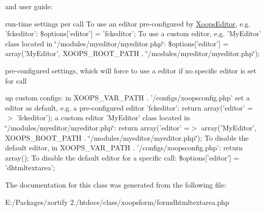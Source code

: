 \begin{DoxyItemize}
\item 
\end{DoxyItemize}and user guide\-:  
\begin{DoxyItemize}
\item 
\end{DoxyItemize}run-\/time settings per call To use an editor pre-\/configured by \hyperlink{}{Xoops\-Editor}, e.\-g. 'fckeditor'\-: {\ttfamily \$options\mbox{[}'editor'\mbox{]} = 'fckeditor';} To use a custom editor, e.\-g. 'My\-Editor' class located in \char`\"{}/modules/myeditor/myeditor.\-php\char`\"{}\-: {\ttfamily \$options\mbox{[}'editor'\mbox{]} = array('My\-Editor', X\-O\-O\-P\-S\-\_\-\-R\-O\-O\-T\-\_\-\-P\-A\-T\-H . \char`\"{}/modules/myeditor/myeditor.\-php\char`\"{});}    
\begin{DoxyItemize}
\item 
\end{DoxyItemize}pre-\/configured settings, which will force to use a editor if no specific editor is set for call  
\begin{DoxyItemize}
\item 
\end{DoxyItemize}up custom configs\-: in X\-O\-O\-P\-S\-\_\-\-V\-A\-R\-\_\-\-P\-A\-T\-H . '/configs/xoopsconfig.php' set a editor as default, e.\-g. a pre-\/configured editor 'fckeditor'\-: {\ttfamily return array('editor' =$>$ 'fckeditor');} a custom editor 'My\-Editor' class located in \char`\"{}/modules/myeditor/myeditor.\-php\char`\"{}\-: {\ttfamily return array('editor' =$>$ array('My\-Editor', X\-O\-O\-P\-S\-\_\-\-R\-O\-O\-T\-\_\-\-P\-A\-T\-H . \char`\"{}/modules/myeditor/myeditor.\-php\char`\"{});}   To disable the default editor, in X\-O\-O\-P\-S\-\_\-\-V\-A\-R\-\_\-\-P\-A\-T\-H . '/configs/xoopsconfig.php'\-: {\ttfamily return array();} To disable the default editor for a specific call\-: {\ttfamily \$options\mbox{[}'editor'\mbox{]} = 'dhtmltextarea';}    

The documentation for this class was generated from the following file\-:\begin{DoxyCompactItemize}
\item 
E\-:/\-Packages/xortify 2./htdocs/class/xoopsform/formdhtmltextarea.\-php\end{DoxyCompactItemize}
